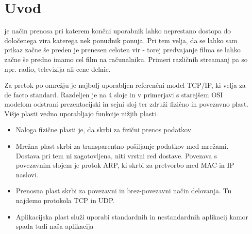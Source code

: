 \documentclass[journal]{IEEEtran}
\begin{document}
%
\IEEEpeerreviewmaketitle



\section{Uvod}
% 
% 
% 
% 
 je način prenosa pri katerem končni uporabnik lahko neprestano dostopa do določenega vira katerega nek ponudnik ponuja. Pri tem velja, da se lahko sam prikaz začne še preden je prenesen celoten vir - torej predvajanje filma se lahko začne še predno imamo cel film na računalniku. Primeri različnih streamanj pa so npr. radio, televizija ali cene delnic.

Za pretok po omrežju je najbolj uporabljen referenčni model TCP/IP, ki velja za de facto standard. Razdeljen je na 4 sloje in v primerjavi s starejšem OSI modelom odstrani prezentacijski in sejni sloj ter združi fizično in povezavno plast. Višje plasti vedno uporabljajo funkcije nižjih plasti.

\begin{itemize}
	\item Naloga fizične plasti je, da skrbi za fizični prenos podatkov. 
	\item  Mrežna plast skrbi za transparentno pošiljanje podatkov med mrežami. Dostava pri tem ni zagotovljena, niti vrstni red dostave. Povezava s povezavnim slojem je protok ARP, ki skrbi za pretvorbo med MAC in IP naslovi.
	\item Prenosna plast skrbi za povezavni in brez-povezavni način delovanja. Tu najdemo protokola TCP in UDP.
	\item Aplikacijska plast služi uporabi standardnih in nestandardnih aplikacij kamor spada tudi naša aplikacija
\end{itemize}
\end{document}
